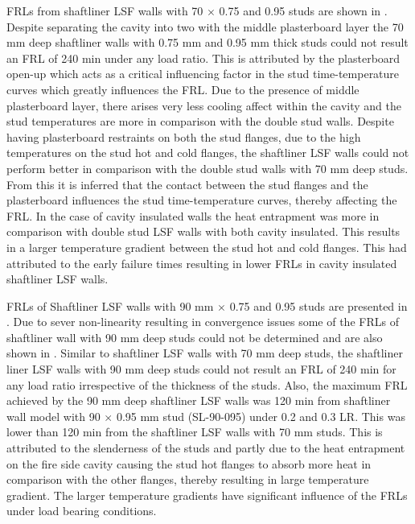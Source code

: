 FRLs from shaftliner LSF walls with 70 $\times$ 0.75 and 0.95 studs are shown in . Despite separating the cavity into two with the middle plasterboard layer the 70 mm deep shaftliner walls with 0.75 mm and 0.95 mm thick studs could not result an FRL of 240 min under any load ratio. This is attributed by the plasterboard open-up which acts as a critical influencing factor in the stud time-temperature curves which greatly influences the FRL. Due to the presence of middle plasterboard layer, there arises very less cooling affect within the cavity and the stud temperatures are more in comparison with the double stud walls. Despite having plasterboard restraints on both the stud flanges, due to the high temperatures on the stud hot and cold flanges, the shaftliner LSF walls could not perform better in comparison with the double stud walls with 70 mm deep studs. From this it is inferred that the contact between the stud flanges and the plasterboard influences the stud time-temperature curves, thereby affecting the FRL. In the case of cavity insulated walls the heat entrapment was more in comparison with double stud LSF walls with both cavity insulated. This results in a larger temperature gradient between the stud hot and cold flanges. This had attributed to the early failure times resulting in lower FRLs in cavity insulated shaftliner LSF walls. 

FRLs of Shaftliner LSF walls with 90 mm $\times$ 0.75 and 0.95 studs are presented in . Due to sever non-linearity resulting in convergence issues some of the FRLs of shaftliner wall with 90 mm deep studs could not be determined and are also shown in . Similar to shaftliner LSF walls with 70 mm deep studs, the shaftliner liner LSF walls with 90 mm deep studs could not result an FRL of 240 min for any load ratio irrespective of the thickness of the studs. Also, the maximum FRL achieved by the 90 mm deep shaftliner LSF walls was 120 min from shaftliner wall model with 90 $\times$ 0.95 mm stud (SL-90-095) under 0.2 and 0.3 LR. This was lower than 120 min from the shaftliner LSF walls with 70 mm studs. This is attributed to the slenderness of the studs and partly due to the heat entrapment on the fire side cavity causing the stud hot flanges to absorb more heat in comparison with the other flanges, thereby resulting in large temperature gradient. The larger temperature gradients have significant influence of the FRLs under load bearing conditions. 

